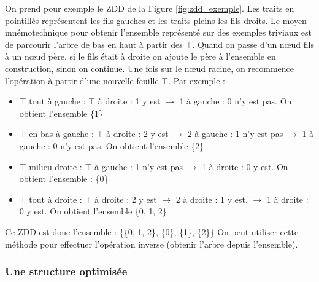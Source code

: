 \documentclass[a4paper]{article}
\begin{document}
On prend pour exemple le ZDD de la Figure \ref{fig:zdd_exemple}. Les traits en 
pointillés représentent les fils gauches et les traits pleins les fils droits.
Le moyen mnémotechnique pour obtenir l'ensemble représenté sur des 
exemples triviaux est de parcourir 
l'arbre de bas en haut à partir des $\top$. Quand on passe d'un n\oe ud fils à un n\oe ud père, si le fils était à droite
on ajoute le père à l'ensemble en construction, sinon on continue. 
Une fois sur le n\oe ud racine,
on recommence l'opération à partir d'une nouvelle feuille $\top$. Par exemple :

\begin{itemize}
\item $\top$ tout à gauche : $\top$ à droite : 1 y est 
$\rightarrow$ 1 à gauche : 0 n'y est pas.
On obtient l'ensemble \{1\}
\item $\top$ en bas à gauche : $\top$ à droite : 2 y est $\rightarrow$  
2 à gauche : 1 n'y est pas $\rightarrow$ 
1 à gauche : 0 n'y est pas. On obtient l'ensemble \{2\}
\item $\top$ milieu droite : $\top$ à gauche : 1 n'y est pas $\rightarrow$
1 à droite : 0 y est.
On obtient l'ensemble : \{0\}
\item $\top$ tout à droite : $\top$ à droite : 2 y est $\rightarrow$ 
2 à droite : 1 y est. $\rightarrow$ 
1 à droite : 0 y est. On obtient l'ensemble \{0, 1, 2\}
\end{itemize}

Ce ZDD est donc l'ensemble : \{\{0, 1, 2\}, \{0\}, \{1\}, \{2\}\}
On peut utiliser cette méthode pour effectuer l'opération inverse (obtenir
l'arbre depuis l'ensemble).


\subsubsection{Une structure optimisée}
\end{document}
